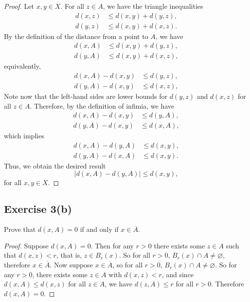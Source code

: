 \documentclass[12pt]{article}
\newenvironment{problem}
    {\begin{lrbox}{\mybox}\begin{minipage}{\textwidth-10pt}}
    {\end{minipage}\end{lrbox}\framebox[6.5in]{\usebox{\mybox}}}
\newcommand{\clo}[1]{\overline{#1}}
\let\emptyset\varnothing
\begin{document}
\begin{proof}
    Let $x,y\in X$. For all $z\in A$, we have the triangle inequalities
    \begin{align*}
        d(x,z) &\leq d(x,y) + d(y,z), \\
        d(y,z) &\leq d(x,y) + d(x,z).
    \end{align*}
    By the definition of the distance from a point to $A$, we have
    \begin{align*}
        d(x,A) &\leq d(x,y) + d(y,z), \\
        d(y,A) &\leq d(x,y) + d(x,z),
    \end{align*}
    equivalently,
    \begin{align*}
        d(x,A) - d(x,y) &\leq d(y,z), \\
        d(y,A) - d(x,y) &\leq d(x,z),
    \end{align*}
    Note now that the left-hand sides are lower bounds for $d(y,z)$ and $d(x,z)$ for all $z\in A$. Therefore, by the definition of infimia, we have
    \begin{align*}
        d(x,A) - d(x,y) &\leq d(y,A), \\
        d(y,A) - d(x,y) &\leq d(x,A),
    \end{align*}
    which implies
    \begin{align*}
        d(x,A) - d(y,A) &\leq d(x,y), \\
        d(y,A) - d(x,A) &\leq d(x,y).
    \end{align*}
    Thus, we obtain the desired result
    \[\bigg| d(x,A) - d(y,A) \bigg| \leq d(x,y),\]
    for all $x,y\in X$.
    
\end{proof}

\subsection*{Exercise 3(b)}
\begin{problem}
    Prove that $d(x,A) = 0$ if and only if $x \in \overline{A}$. 
\end{problem}

\begin{proof}
    Suppose $d(x,A)=0$. Then for any $r>0$ there exists some $z\in A$ such that $d(x,z)<r$, that is, $z\in B_r(x)$. So for all $r>0$, $B_r(x)\cap A \ne\emptyset$, therefore $x\in\clo{A}$. Now suppose $x\in\clo{A}$, so for all $r>0$, $B_r(x)\cap A \ne\emptyset$. So for any $r>0$, there exists some $z\in A$ with $d(x,z)<r$, and since $d(x,A)\leq d(x,z)$ for all $z\in A$, we have $d(z,A)\leq r$ for all $r>0$. Therefore $d(x,A)=0$.
    
\end{proof}
\end{document}
